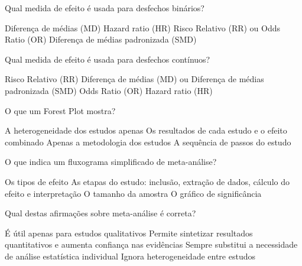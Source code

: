 \documentclass[12pt,a4paper]{exam}
\begin{document}
\begin{questions}
\question Qual medida de efeito é usada para desfechos binários?  
\begin{choices}
\choice Diferença de médias (MD)
\choice Hazard ratio (HR)
\CorrectChoice Risco Relativo (RR) ou Odds Ratio (OR)
\choice Diferença de médias padronizada (SMD)
\end{choices}

\question Qual medida de efeito é usada para desfechos contínuos?  
\begin{choices}
\choice Risco Relativo (RR)
\CorrectChoice Diferença de médias (MD) ou Diferença de médias padronizada (SMD)
\choice Odds Ratio (OR)
\choice Hazard ratio (HR)
\end{choices}

\question O que um Forest Plot mostra?  
\begin{choices}
\choice A heterogeneidade dos estudos apenas
\CorrectChoice Os resultados de cada estudo e o efeito combinado
\choice Apenas a metodologia dos estudos
\choice A sequência de passos do estudo
\end{choices}

\question O que indica um fluxograma simplificado de meta-análise?  
\begin{choices}
\choice Os tipos de efeito
\CorrectChoice As etapas do estudo: inclusão, extração de dados, cálculo do efeito e interpretação
\choice O tamanho da amostra
\choice O gráfico de significância
\end{choices}

\question Qual destas afirmações sobre meta-análise é correta?  
\begin{choices}
\choice É útil apenas para estudos qualitativos
\CorrectChoice Permite sintetizar resultados quantitativos e aumenta confiança nas evidências
\choice Sempre substitui a necessidade de análise estatística individual
\choice Ignora heterogeneidade entre estudos
\end{choices}

\end{questions}
\end{document}
